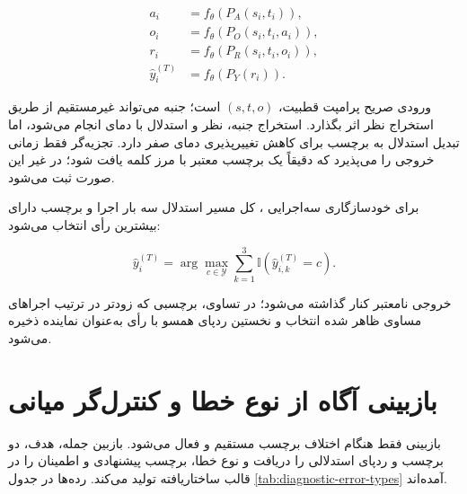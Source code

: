 \begin{align}
    a_i &= f_{\theta}\!\left(P_A(s_i,t_i)\right),\\
    o_i &= f_{\theta}\!\left(P_O(s_i,t_i,a_i)\right),\\
    r_i &= f_{\theta}\!\left(P_R(s_i,t_i,o_i)\right),\\
    \hat y_i^{(T)} &= f_{\theta}\!\left(P_Y(r_i)\right).
\end{align}

ورودی صریح پرامپت قطبیت، $(s,t,o)$ است؛ جنبه می‌تواند غیرمستقیم از طریق استخراج نظر اثر بگذارد. استخراج جنبه، نظر و استدلال با دمای  انجام می‌شود، اما تبدیل استدلال به برچسب برای کاهش تغییرپذیری دمای صفر دارد. تجزیه‌گر فقط زمانی خروجی را می‌پذیرد که دقیقاً یک برچسب معتبر با مرز کلمه یافت شود؛ در غیر این صورت  ثبت می‌شود.

برای خودسازگاری سه‌اجرایی ، کل مسیر استدلال سه بار اجرا و برچسب دارای بیشترین رأی انتخاب می‌شود:

\begin{equation}
    \hat y_i^{(T)}=\arg\max_{c\in\mathcal{Y}}
    \sum_{k=1}^{3}\mathbb{I}\!\left(\hat y_{i,k}^{(T)}=c\right).
    \label{eq:thor-sc3}
\end{equation}

خروجی نامعتبر کنار گذاشته می‌شود؛ در تساوی، برچسبی که زودتر در ترتیب اجراهای مساوی ظاهر شده انتخاب و نخستین ردپای همسو با رأی به‌عنوان نماینده ذخیره می‌شود.

\section{بازبینی آگاه از نوع خطا و کنترل‌گر میانی}

بازبینی فقط هنگام اختلاف برچسب مستقیم و  فعال می‌شود. بازبین جمله، هدف، دو برچسب و ردپای استدلالی را دریافت و نوع خطا، برچسب پیشنهادی و اطمینان  را در قالب ساختاریافته تولید می‌کند. رده‌ها در جدول \ref{tab:diagnostic-error-types} آمده‌اند.

